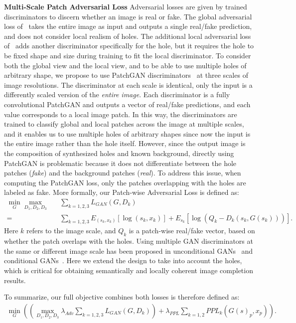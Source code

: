 \noindent\textbf{Multi-Scale Patch Adversarial Loss} Adversarial losses are given by trained discriminators to discern whether an image is real or fake. The global adversarial loss of~\cite{pathak2016context} takes the entire image as input and outputs a single real/fake prediction, and does not consider local realism of holes. The additional local adversarial loss of~\cite{iizuka2017globally} adds another discriminator specifically for the hole, but it requires the hole to be fixed shape and size during training to fit the local discriminator. To consider both the global view and the local view, and to be able to use multiple holes of arbitrary shape, we propose to use PatchGAN discriminators~\cite{isola2016image} at three scales of image resolutions. The discriminator at each scale is identical, only the input is a differently scaled version of the \textit{entire image}. Each discriminator is a fully convolutional PatchGAN and outputs a vector of real/fake predictions, and each value corresponds to a local image patch. In this way, the discriminators are trained to classify global and local patches across the image at multiple scales, and it enables us to use multiple holes of arbitrary shapes since now the input is the entire image rather than the hole itself. However, since the output image is the composition of synthesized holes and known background, directly using PatchGAN is problematic because it does not differentiate between the hole patches (\textit{fake}) and the background patches (\textit{real}). To address this issue, when computing the PatchGAN loss, only the patches overlapping with the holes are labeled as fake. More formally, our Patch-wise Adversarial Loss is defined as: 
\begin{eqnarray}
\min\limits_G\max\limits_{D_1, D_2, D_3}&&\sum\limits_{k=1,2,3} L_{GAN}(G,D_k)  \\ = &&\sum\limits_{k=1,2,3}E_{(s_k,x_k)}[\log (s_k,x_k)] + E_{s_k}[\log (Q_k-D_k(s_k,G(s_k)))].
\end{eqnarray}
\label{eqn:adversarial_loss}
Here $k$ refers to the image scale, and $Q_k$ is a patch-wise real/fake vector, based on whether the patch overlaps with the holes. Using multiple GAN discriminators at the same or different image scale has been proposed in unconditional GANs~\cite{durugkar2016generative} and conditional GANs~\cite{wang2017high}. Here we extend the design to take into account the holes, which is critical for obtaining semantically and locally coherent image completion results.

To summarize, our full objective combines both losses is therefore defined as:
\begin{eqnarray}
\min\limits_G((\max\limits_{D_1, D_2, D_3}\lambda_{Adv}\sum\limits_{k=1,2,3} L_{GAN}(G,D_k))+\lambda_{PPL}\sum\limits_{k=1,2}PPL_k(G(s)_p, x_p)).
\end{eqnarray}

